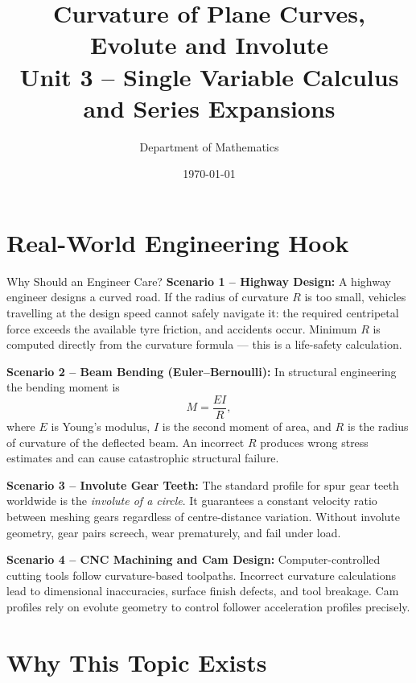 \documentclass[12pt,a4paper]{article}
\title{\textbf{Curvature of Plane Curves, Evolute and Involute} \\ \large Unit 3 -- Single Variable Calculus and Series Expansions}
\author{Department of Mathematics}
\date{\today}
\begin{document}
\maketitle
\tableofcontents
\newpage

\section{Real-World Engineering Hook}

\begin{curiositybox}{Why Should an Engineer Care?}
\textbf{Scenario 1 -- Highway Design:} A highway engineer designs a curved road. If the radius of curvature $R$ is too small, vehicles travelling at the design speed cannot safely navigate it: the required centripetal force exceeds the available tyre friction, and accidents occur. Minimum $R$ is computed directly from the curvature formula --- this is a life-safety calculation.

\medskip
\textbf{Scenario 2 -- Beam Bending (Euler--Bernoulli):} In structural engineering the bending moment is
\[
  M = \frac{EI}{R},
\]
where $E$ is Young's modulus, $I$ is the second moment of area, and $R$ is the radius of curvature of the deflected beam. An incorrect $R$ produces wrong stress estimates and can cause catastrophic structural failure.

\medskip
\textbf{Scenario 3 -- Involute Gear Teeth:} The standard profile for spur gear teeth worldwide is the \emph{involute of a circle}. It guarantees a constant velocity ratio between meshing gears regardless of centre-distance variation. Without involute geometry, gear pairs screech, wear prematurely, and fail under load.

\medskip
\textbf{Scenario 4 -- CNC Machining and Cam Design:} Computer-controlled cutting tools follow curvature-based toolpaths. Incorrect curvature calculations lead to dimensional inaccuracies, surface finish defects, and tool breakage. Cam profiles rely on evolute geometry to control follower acceleration profiles precisely.
\end{curiositybox}

\section{Why This Topic Exists}
\end{document}
